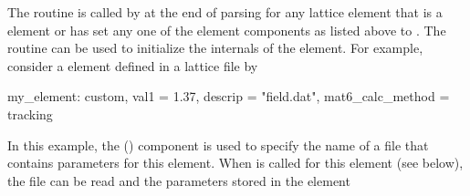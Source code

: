 The  routine is called by
 at the end of parsing for any
lattice element that is a  element or has set any one of
the element components as listed above to . The
 routine can be used to initialize the internals of
the element. For example, consider a  element defined in a
lattice file by
\begin{example}
  my_element: custom, val1 = 1.37, descrip = "field.dat", mat6_calc_method = tracking
\end{example}
In this example, the  () component is used
to specify the name of a file that contains parameters for this
element. When  is called for this element (see below),
the file can be read and the parameters stored in the element
